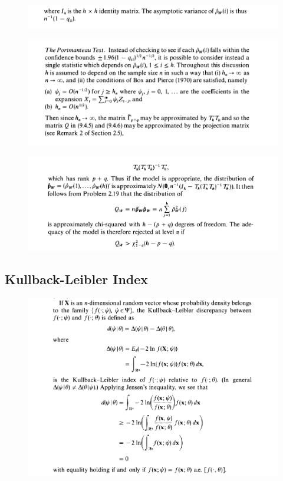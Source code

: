 \begin{figure}[H]
    \centering
    \includegraphics[width=1\textwidth]{../pictures/image7.png}
\end{figure}

\begin{figure}[H]
    \centering
    \includegraphics[width=1\textwidth]{../pictures/image8.png}
\end{figure}

\begin{figure}[H]
    \centering
    \includegraphics[width=1\textwidth]{../pictures/image9.png}
\end{figure}

\subsection*{Kullback-Leibler Index}

\begin{figure}[H]
    \centering
    \includegraphics[width=1\textwidth]{../pictures/image10.png}
\end{figure}

